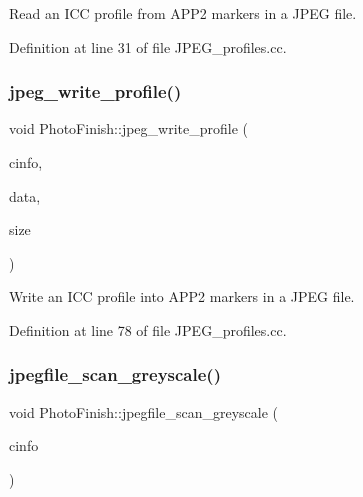 Read an I\+CC profile from A\+P\+P2 markers in a J\+P\+EG file. 



Definition at line 31 of file J\+P\+E\+G\+\_\+profiles.\+cc.

\mbox{\label{namespace_photo_finish_a0437f142c40159470e827e79c20f6d59}} 
\subsubsection{\texorpdfstring{jpeg\+\_\+write\+\_\+profile()}{jpeg\_write\_profile()}}
{\footnotesize\ttfamily void Photo\+Finish\+::jpeg\+\_\+write\+\_\+profile (\begin{DoxyParamCaption}\item[{jpeg\+\_\+compress\+\_\+struct $\ast$}]{cinfo,  }\item[{unsigned char $\ast$}]{data,  }\item[{unsigned int}]{size }\end{DoxyParamCaption})}



Write an I\+CC profile into A\+P\+P2 markers in a J\+P\+EG file. 



Definition at line 78 of file J\+P\+E\+G\+\_\+profiles.\+cc.

\mbox{\label{namespace_photo_finish_aeb3ed185a3672cf727f112889c7320d5}} 
\subsubsection{\texorpdfstring{jpegfile\+\_\+scan\+\_\+greyscale()}{jpegfile\_scan\_greyscale()}}
{\footnotesize\ttfamily void Photo\+Finish\+::jpegfile\+\_\+scan\+\_\+greyscale (\begin{DoxyParamCaption}\item[{jpeg\+\_\+compress\+\_\+struct $\ast$}]{cinfo }\end{DoxyParamCaption})}



